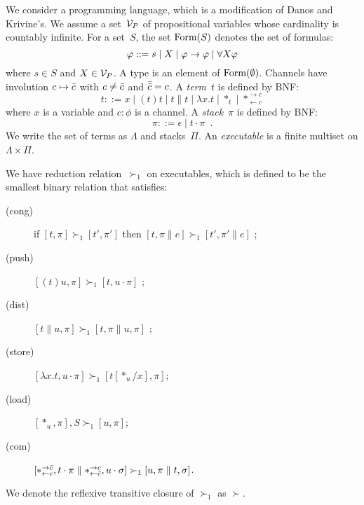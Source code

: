 
\newcommand{\conc}{\parallel}
\newcommand{\comod}[2]{\ast^{\rightarrow {#2}}_{\leftarrow{#1}}}
\newcommand{\reader}[1]{\ast_{\leftarrow{#1}}}

We consider a programming language, which is a modification of
Danos and Krivine's.
We assume a set~$\mathcal V_P$ of propositional variables whose cardinality is
countably infinite.
For a set~$S$,
the set $\mathop{\text{Form}}(S)$ denotes the set of formulas:
\[
\varphi::= s \mid X \mid \varphi\rightarrow\varphi\mid \forall X \varphi
\]
where $s\in S$ and $X\in \mathcal V_P$.
A type is an element of $\mathop{\text{Form}}(\emptyset)$.
Channels have involution $c\mapsto\bar{c}$ with
$c\neq \bar{c}$ and
$\bar{\bar{c}} = c$.
A \textit{term}~$t$ is defined by BNF:
\[
 t::= x
 \mid (t)t
 \mid t\conc t
 \mid \lambda x.t
 \mid \ast_t
 \mid \comod c c
\]
where $x$ is a variable and $c\colon\phi$ is a channel.
A \textit{stack}~$\pi$ is defined by BNF:
\[
 \pi ::= \epsilon
 \mid t\cdot \pi
 \enspace.
\]
We write the set of terms as $\Lambda$ and stacks~$\Pi$.
An \textit{executable} is a finite multiset on $\Lambda \times \Pi$.

\newcommand{\red}{\succ_1}
\renewcommand{\reduce}{\succ}
We have reduction relation~$\red$ on executables,
which is defined to be the smallest binary relation
that satisfies:
\begin{description}
 \item[(cong)] if
	    $[t,\pi]         \red [ t',\pi']$
	    then
	    $[t,\pi \conc e] \red [ t',\pi'\conc e]$  \enspace;
 \item[(push)]
	    $[(t)u,\pi]      \red [t,u\cdot\pi]$      \enspace;
 \item[(dist)]
	    $[t\conc u,\pi]  \red [t,\pi\conc u,\pi]$ \enspace;
 \item[(store)]
	    $[\lambda x.t,u\cdot\pi]
	     \red
	     [t[\ast_u/x],      \pi]$\enspace;
 \item[(load)]
	    $[\ast_u,\pi],S\red[u,\pi]$\enspace;
 \item[(com)]
	    $[\comod c{\co c}, t\cdot\pi\conc \comod{\co c}c,
	    u\cdot\sigma] \red
	    [u,\pi\conc t,\sigma]$\enspace.
\end{description}
We denote the reflexive transitive closure of $\red$ as $\reduce$.


